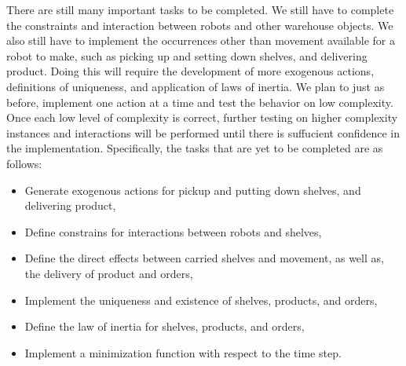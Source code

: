 \documentclass[letterpaper]{article} %
\begin{document}
There are still many important tasks to be completed. We still have to complete the constraints and interaction between robots and other warehouse objects. We also still have to implement the occurrences other than movement available for a robot to make, such as picking up and setting down shelves, and delivering product. Doing this will require the development of more exogenous actions, definitions of uniqueness, and application of laws of inertia. We plan to just as before, implement one action at a time and test the behavior on low complexity. Once each low level of complexity is correct, further testing on higher complexity instances and interactions will be performed until there is suffucient confidence in the implementation. Specifically, the tasks that are yet to be completed are as follows:
\begin{itemize}
\item Generate exogenous actions for pickup and putting down shelves, and delivering product,
\item Define constrains for interactions between robots and shelves,
\item Define the direct effects between carried shelves and movement, as well as, the delivery of product and orders,
\item Implement the uniqueness and existence of shelves, products, and orders,
\item Define the law of inertia for shelves, products, and orders,
\item Implement a minimization function with respect to the time step.
\end{itemize}


 

\newpage
\end{document}
